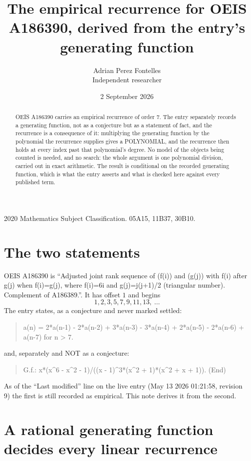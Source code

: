 \documentclass[11pt,a4paper]{article}
\title{The empirical recurrence for OEIS A186390, derived from the entry's generating function}
\author{Adrian Perez Fontelles\\ \small Independent researcher}
\date{2 September 2026}
\theoremstyle{plain}
\theoremstyle{definition}
\begin{document}
\maketitle

\begin{abstract}
OEIS A186390 carries an empirical recurrence of order $7$. The entry separately records a
generating function, not as a conjecture but as a statement of fact, and the recurrence is a
consequence of it: multiplying the generating function by the polynomial the recurrence
supplies gives a POLYNOMIAL, and the recurrence then holds at every index past that
polynomial's degree. No model of the objects being counted is needed, and no search: the
whole argument is one polynomial division, carried out in exact arithmetic. The result is
conditional on the recorded generating function, which is what the entry asserts and what is
checked here against every published term.
\end{abstract}

\noindent\small 2020 Mathematics Subject Classification. 05A15, 11B37, 30B10.\normalsize

\section{The two statements}

OEIS A186390 is ``Adjusted joint rank sequence of (f(i)) and (g(j)) with f(i) after g(j) when f(i)=g(j), where f(i)=6i and g(j)=j(j+1)/2 (triangular number).  Complement of A186389.''. It has offset $1$ and begins
\[
1, 2, 3, 5, 7, 9, 11, 13,\ \dots
\]
The entry states, as a conjecture and never marked settled:
\begin{quote}
a(n) = 2*a(n-1) - 2*a(n-2) + 3*a(n-3) - 3*a(n-4) + 2*a(n-5) - 2*a(n-6) + a(n-7) for n > 7.
\end{quote}
and, separately and NOT as a conjecture:
\begin{quote}
G.f.: x*(x\^{}6 - x\^{}2 - 1)/((x - 1)\^{}3*(x\^{}2 + 1)*(x\^{}2 + x + 1)). (End)
\end{quote}
As of the ``Last modified'' line on the live entry (May 13 2026 01:21:58, revision 9) the first is still
recorded as empirical. This note derives it from the second.

\section{A rational generating function decides every linear recurrence}
\end{document}
